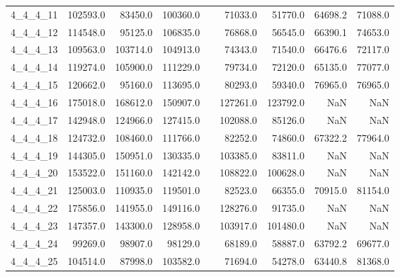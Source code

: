 \begin{longtable}{lrrrcrrrr}
4\_4\_4\_11      &    102593.0 &       83450.0 &       100360.0 &&       71033.0 &         51770.0 &          64698.2 &          71088.0 \\
4\_4\_4\_12      &    114548.0 &       95125.0 &       106835.0 &&       76868.0 &         56545.0 &          66390.1 &          74653.0 \\
4\_4\_4\_13      &    109563.0 &      103714.0 &       104913.0 &&       74343.0 &         71540.0 &          66476.6 &          72117.0 \\
4\_4\_4\_14      &    119274.0 &      105900.0 &       111229.0 &&       79734.0 &         72120.0 &          65135.0 &          77077.0 \\
4\_4\_4\_15      &    120662.0 &       95160.0 &       113695.0 &&       80293.0 &         59340.0 &          76965.0 &          76965.0 \\
4\_4\_4\_16      &    175018.0 &      168612.0 &       150907.0 &&      127261.0 &        123792.0 &              NaN &              NaN \\
4\_4\_4\_17      &    142948.0 &      124966.0 &       127415.0 &&      102088.0 &         85126.0 &              NaN &              NaN \\
4\_4\_4\_18      &    124732.0 &      108460.0 &       111766.0 &&       82252.0 &         74860.0 &          67322.2 &          77964.0 \\
4\_4\_4\_19      &    144305.0 &      150951.0 &       130335.0 &&      103385.0 &         83811.0 &              NaN &              NaN \\
4\_4\_4\_20      &    153522.0 &      151160.0 &       142142.0 &&      108822.0 &        100628.0 &              NaN &              NaN \\
4\_4\_4\_21      &    125003.0 &      110935.0 &       119501.0 &&       82523.0 &         66355.0 &          70915.0 &          81154.0 \\
4\_4\_4\_22      &    175856.0 &      141955.0 &       149116.0 &&      128276.0 &         91735.0 &              NaN &              NaN \\
4\_4\_4\_23      &    147357.0 &      143300.0 &       128958.0 &&      103917.0 &        101480.0 &              NaN &              NaN \\
4\_4\_4\_24      &     99269.0 &       98907.0 &        98129.0 &&       68189.0 &         58887.0 &          63792.2 &          69677.0 \\
4\_4\_4\_25      &    104514.0 &       87998.0 &       103582.0 &&       71694.0 &         54278.0 &          63440.8 &          81368.0 \\

\end{longtable}
